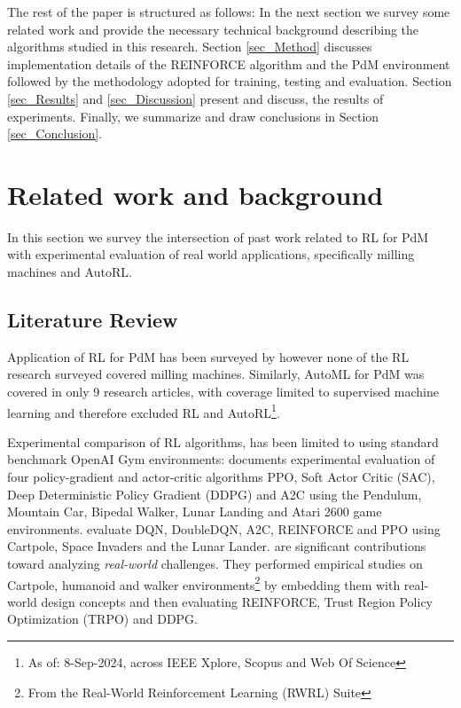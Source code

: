 \documentclass[referee, sn-mathphys-num]{sn-jnl}
\begin{document}
	The rest of the paper is structured as follows: In the next section we survey some related work and provide the necessary technical background describing the algorithms studied in this research. Section \ref{sec_Method} discusses implementation details of the REINFORCE algorithm and the PdM environment followed by the methodology adopted for training, testing and evaluation. Section \ref{sec_Results} and \ref{sec_Discussion} present and discuss, the results of experiments. Finally, we summarize and draw conclusions in Section \ref{sec_Conclusion}.
	
	\section{Related work and background}\label{sec_SLR}
	In this section we survey the intersection of past work related to RL for PdM with experimental evaluation of real world applications, specifically milling machines and AutoRL.
	
	\subsection{Literature Review}
	Application of RL for PdM has been surveyed by \cite{Panzer2021, Erhan2021, siraskar2023} however none of the RL research surveyed covered milling machines. Similarly, AutoML for PdM was covered in only 9 research articles, with coverage limited to supervised machine learning and therefore excluded RL and AutoRL\footnote{As of: 8-Sep-2024, across IEEE Xplore\texttrademark{}, Scopus\texttrademark{} and Web Of Science\texttrademark{}}.
	
	Experimental comparison of RL algorithms, has been limited to using standard benchmark OpenAI Gym environments: \cite{sandeep2022experimental} documents experimental evaluation of four policy-gradient and actor-critic algorithms PPO, Soft Actor Critic (SAC), Deep Deterministic Policy Gradient (DDPG) and A2C using the Pendulum, Mountain Car, Bipedal Walker, Lunar Landing and Atari 2600 game environments. \cite{Krishna2020} evaluate DQN, DoubleDQN, A2C, REINFORCE and PPO using Cartpole, Space Invaders and the Lunar Lander. \cite{dulac2021, dulac2020empirical} are significant contributions toward analyzing \textit{real-world} challenges. They performed empirical studies on Cartpole, humanoid and walker environments\footnote{From the Real-World Reinforcement Learning (RWRL) Suite} by embedding them with real-world design concepts and then evaluating REINFORCE, Trust Region Policy Optimization (TRPO) and DDPG. %
	
\end{document}
